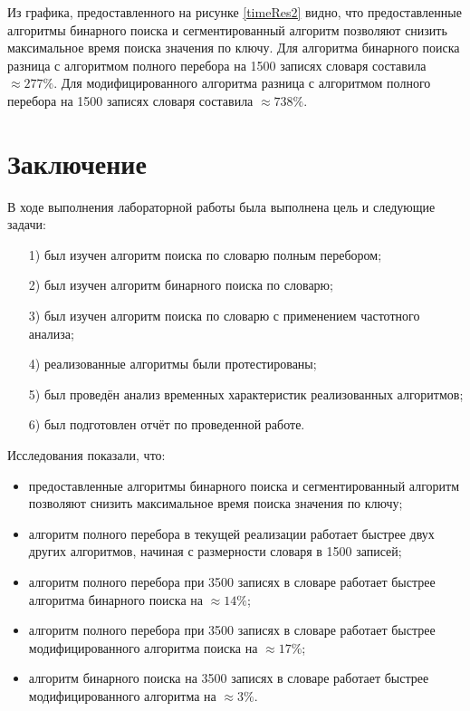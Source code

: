 \documentclass[12pt]{report}
\begin{document}
Из графика, предоставленного на рисунке \ref{timeRes2} видно, что предоставленные алгоритмы бинарного поиска и сегментированный алгоритм позволяют снизить максимальное время поиска значения по ключу. Для алгоритма бинарного поиска разница с алгоритмом полного перебора на 1500 записях словаря составила $\approx 277\%$. Для модифицированного алгоритма разница с алгоритмом полного перебора на 1500 записях словаря составила $\approx 738\%$.

\chapter*{Заключение}
В ходе выполнения лабораторной работы была выполнена цель и следующие задачи:
\begin{enumerate}
\item[1)] был изучен алгоритм поиска по словарю полным перебором;
\item[2)] был изучен алгоритм бинарного поиска по словарю;
\item[3)] был изучен алгоритм поиска по словарю с применением частотного анализа;
\item[4)] реализованные алгоритмы были протестированы;
\item[5)] был проведён анализ временных характеристик реализованных алгоритмов;
\item[6)] был подготовлен отчёт по проведенной работе.
\end{enumerate}

Исследования показали, что:
\begin{itemize}
\item предоставленные алгоритмы бинарного поиска и сегментированный алгоритм позволяют снизить максимальное время поиска значения по ключу;
\item алгоритм полного перебора в текущей реализации работает быстрее двух других алгоритмов, начиная с размерности словаря в 1500 записей;
\item алгоритм полного перебора при 3500 записях в словаре работает быстрее алгоритма бинарного поиска на $\approx 14\%$;
\item алгоритм полного перебора при 3500 записях в словаре работает быстрее модифицированного алгоритма поиска на $\approx 17\%$;
\item алгоритм бинарного поиска на 3500 записях в словаре работает быстрее модифицированного алгоритма на $\approx 3\%$.
\end{itemize}

\end{document}
